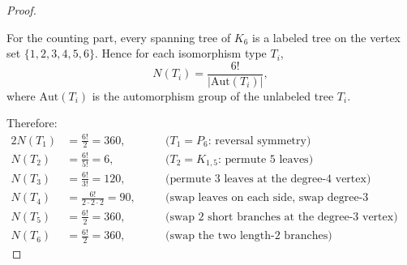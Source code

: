 \documentclass[11pt, a4paper]{ctexrep}
\begin{document}
\begin{proof}
\begin{center}
    \end{center}
    \medskip

    For the counting part, every spanning tree of $K_6$ is a labeled tree on the vertex set $\{1,2,3,4,5,6\}$. Hence for each isomorphism type $T_i$,
    \[
        N(T_i)=\frac{6!}{|\mathrm{Aut}(T_i)|},
    \]
    where $\mathrm{Aut}(T_i)$ is the automorphism group of the unlabeled tree $T_i$.

    Therefore:
    \begin{alignat*}{2}
        N(T_1) & = \frac{6!}{2}=360,
               & \quad                            & \text{($T_1=P_6$: reversal symmetry)}                     \\
        N(T_2) & = \frac{6!}{5!}=6,
               &                                  & \text{($T_2=K_{1,5}$: permute 5 leaves)}                  \\
        N(T_3) & = \frac{6!}{3!}=120,
               &                                  & \text{(permute 3 leaves at the degree-4 vertex)}          \\
        N(T_4) & = \frac{6!}{2\cdot 2\cdot 2}=90,
               &                                  & \text{(swap leaves on each side, swap degree-3 vertices)} \\
        N(T_5) & = \frac{6!}{2}=360,
               &                                  & \text{(swap 2 short branches at the degree-3 vertex)}     \\
        N(T_6) & = \frac{6!}{2}=360,
               &                                  & \text{(swap the two length-$2$ branches)}
    \end{alignat*}


\end{proof}
\end{document}
